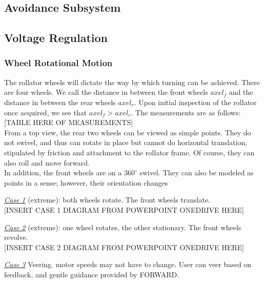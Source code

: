 \subsection{Avoidance Subsystem}

\subsection{Voltage Regulation}


\subsubsection{Wheel Rotational Motion}
\noindent The rollator wheels will dictate the way by which turning can be achieved. There are four wheels. We call the distance in between the front wheels $axel_f$ and the distance in between the rear wheels $axel_r$. Upon initial inspection of the rollator once acquired, we see that $axel_f > axel_r$. The measurements are as follows:\\

[TABLE HERE OF MEASUREMENTS]\\

\noindent From a top view, the rear two wheels can be viewed as simple points. They do not swivel, and thus can rotate in place but cannot do horizontal translation, stipulated by friction and attachment to the rollator frame. Of course, they can also roll and move forward.\\

\noindent In addition, the front wheels are on a $360^{\circ}$ swivel. They can also be modeled as points in a sense; however, their orientation changes

\noindent \underline{\textit{Case 1}} (extreme): both wheels rotate. The front wheels translate.\\

[INSERT CASE 1 DIAGRAM FROM POWERPOINT ONEDRIVE HERE]

\noindent \underline{\textit{Case 2}} (extreme): one wheel rotates, the other stationary. The front wheels revolve.\\

[INSERT CASE 2 DIAGRAM FROM POWERPOINT ONEDRIVE HERE]

\noindent \underline{\textit{Case 3}} Veering. motor speeds may not have to change. User can veer based on feedback, and gentle guidance provided by FORWARD.\\

